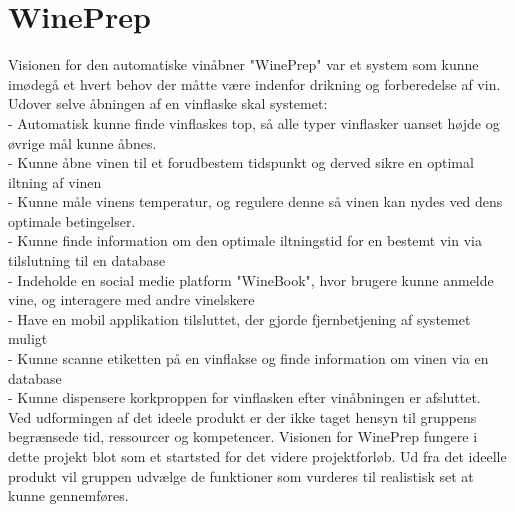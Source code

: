 \section{WinePrep}
Visionen for den automatiske vinåbner "WinePrep" var et system som kunne imødegå et hvert behov der måtte være indenfor drikning og forberedelse af vin. \\
Udover selve åbningen af en vinflaske skal systemet:\\
- Automatisk kunne finde vinflaskes top, så alle typer vinflasker uanset højde og øvrige mål kunne åbnes.\\ 
- Kunne åbne vinen til et forudbestem tidspunkt og derved sikre en optimal iltning af vinen\\
- Kunne måle vinens temperatur, og regulere denne så vinen kan nydes ved dens optimale betingelser.\\
- Kunne finde information om den optimale iltningstid for en bestemt vin via tilslutning til en database\\
- Indeholde en social medie platform "WineBook", hvor brugere kunne anmelde vine, og interagere med andre vinelskere\\
- Have en mobil applikation tilsluttet, der gjorde fjernbetjening af systemet muligt\\
- Kunne scanne etiketten på en vinflakse og finde information om vinen via en database\\
- Kunne dispensere korkproppen for vinflasken efter vinåbningen er afsluttet.\\

Ved udformingen af det ideele produkt er der ikke taget hensyn til gruppens begrænsede tid, ressourcer og kompetencer. Visionen for WinePrep fungere
i dette projekt blot som et startsted for det videre projektforløb. Ud fra det ideelle produkt vil gruppen udvælge de funktioner som vurderes til realistisk
set at kunne gennemføres. 

